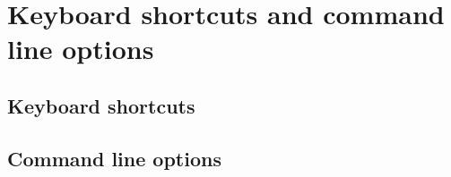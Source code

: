 \chapter{Keyboard shortcuts and command line options}

\section{Keyboard shortcuts}

\allkbd

\clearpage

\section{Command line options}

\newcommand{\atoc}{\textcolor{blue}{atomes}}
\newcommand{\xyz}{\textcolor{cyan}{{\bf{\texttt{-xyz}}}}}
\newcommand{\cif}{\textcolor{cyan}{{\bf{\texttt{-cif}}}}}
\newcommand{\pdb}{\textcolor{cyan}{{\bf{\texttt{-pdb}}}}}
\newcommand{\this}{\textcolor{brown}{{\bf{\texttt{this.f}}}}}
\newcommand{\that}{\textcolor{brown}{{\bf{\texttt{that.f}}}}}
\newcommand{\fawf}{\textcolor{red}{{\bf{\texttt{file.awf}}}}}

